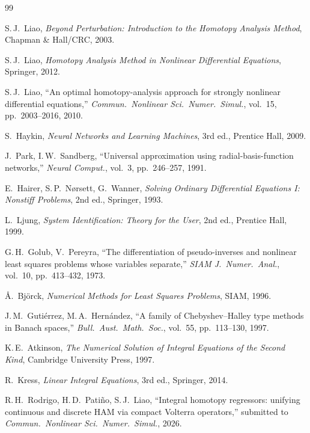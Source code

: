 \documentclass[11pt,a4paper]{article}
\begin{document}
\begin{thebibliography}{99}

S.\,J.\ Liao, \textit{Beyond Perturbation: Introduction to the Homotopy Analysis Method}, Chapman \& Hall/CRC, 2003.

S.\,J.\ Liao, \textit{Homotopy Analysis Method in Nonlinear Differential Equations}, Springer, 2012.

S.\,J.\ Liao, ``An optimal homotopy-analysis approach for strongly nonlinear differential equations,'' \textit{Commun.\ Nonlinear Sci.\ Numer.\ Simul.}, vol.~15, pp.~2003--2016, 2010.

S.\ Haykin, \textit{Neural Networks and Learning Machines}, 3rd ed., Prentice Hall, 2009.

J.\ Park, I.\,W.\ Sandberg, ``Universal approximation using radial-basis-function networks,'' \textit{Neural Comput.}, vol.~3, pp.~246--257, 1991.

E.\ Hairer, S.\,P.\ N\o rsett, G.\ Wanner, \textit{Solving Ordinary Differential Equations I: Nonstiff Problems}, 2nd ed., Springer, 1993.

L.\ Ljung, \textit{System Identification: Theory for the User}, 2nd ed., Prentice Hall, 1999.

G.\,H.\ Golub, V.\ Pereyra, ``The differentiation of pseudo-inverses and nonlinear least squares problems whose variables separate,'' \textit{SIAM J.\ Numer.\ Anal.}, vol.~10, pp.~413--432, 1973.

\AA.\ Bj\"orck, \textit{Numerical Methods for Least Squares Problems}, SIAM, 1996.

J.\,M.\ Guti\'errez, M.\,A.\ Hern\'andez, ``A family of Chebyshev--Halley type methods in Banach spaces,'' \textit{Bull.\ Aust.\ Math.\ Soc.}, vol.~55, pp.~113--130, 1997.

K.\,E.\ Atkinson, \textit{The Numerical Solution of Integral Equations of the Second Kind}, Cambridge University Press, 1997.

R.\ Kress, \textit{Linear Integral Equations}, 3rd ed., Springer, 2014.

R.\,H.\ Rodrigo, H.\,D.\ Pati\~no, S.\,J.\ Liao, ``Integral homotopy regressors: unifying continuous and discrete HAM via compact Volterra operators,'' submitted to \textit{Commun.\ Nonlinear Sci.\ Numer.\ Simul.}, 2026.


\end{thebibliography}
\end{document}
